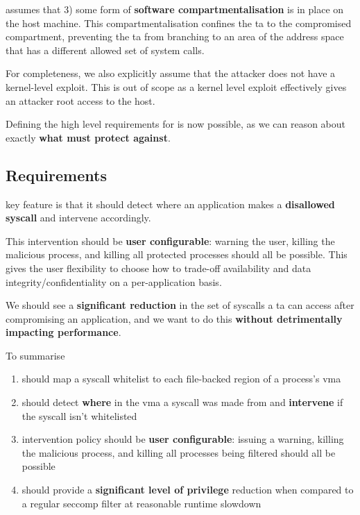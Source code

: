 \af assumes that 3) some form of \textbf{software compartmentalisation} is in
place on the host machine. This compartmentalisation confines the \ac{ta} to the
compromised compartment, preventing the \ac{ta} 
from branching to an area of the address space that has a different allowed set
of system calls.


For completeness, we also explicitly assume that the attacker does not have a
kernel-level exploit. This is out of scope as a kernel level exploit effectively
gives an attacker root access to the host.

Defining the high level requirements for \af is now possible, as we can reason
about exactly \textbf{what \af must protect against}.


\subsection{Requirements} \label{subsec:requirements}

\afg key feature is that it should detect where an application makes a 
\textbf{disallowed syscall} and intervene accordingly. 

This intervention should be \textbf{user configurable}: warning the user, killing 
the malicious process, and killing all protected processes should all be
possible. This gives the user flexibility to choose how to trade-off
availability and data integrity/confidentiality on a per-application basis.

We should see a \textbf{significant reduction} in the set of syscalls a \ac{ta}
can access after compromising an application, and we want to do this
\textbf{without detrimentally impacting performance}.

To summarise 

\begin{enumerate}
    \item \af should map a syscall whitelist to each file-backed region of a
        process's \ac{vma}
    \item \af should detect \textbf{where} in the \ac{vma} a syscall was made
        from and \textbf{intervene} if the syscall isn't whitelisted
    \item \afg intervention policy should be \textbf{user configurable}: issuing
        a warning, killing the malicious process, and killing all processes
        being filtered should all be possible
    \item \af should provide a \textbf{significant level of privilege} reduction
        when compared to a regular seccomp filter at reasonable runtime slowdown
\end{enumerate}

